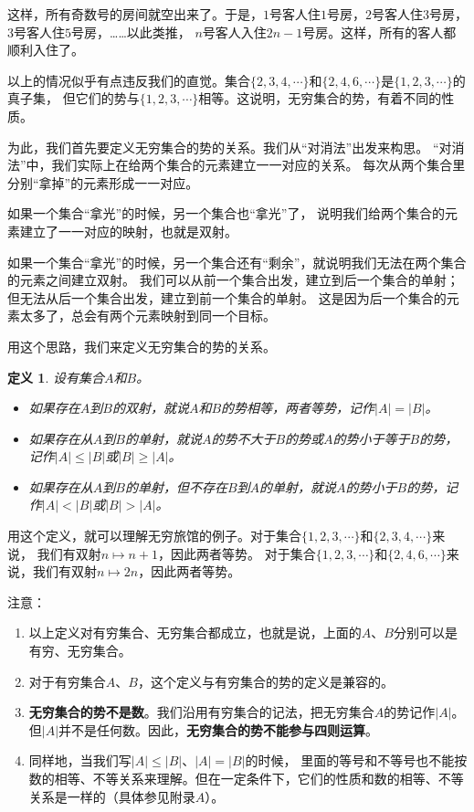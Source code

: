 \documentclass[12pt,UTF8]{ctexbook}
\newtheorem{df}{定义}[section]
\begin{document}
这样，所有奇数号的房间就空出来了。于是，$1$号客人住$1$号房，$2$号客人住$3$号房，$3$号客人住$5$号房，……以此类推，
$n$号客人入住$2n-1$号房。这样，所有的客人都顺利入住了。

以上的情况似乎有点违反我们的直觉。集合$\{2,3,4,\cdots\}$和$\{2,4,6,\cdots\}$是$\{1,2,3,\cdots\}$的真子集，
但它们的势与$\{1,2,3,\cdots\}$相等。这说明，无穷集合的势，有着不同的性质。

为此，我们首先要定义无穷集合的势的关系。我们从“对消法”出发来构思。
“对消法”中，我们实际上在给两个集合的元素建立一一对应的关系。
每次从两个集合里分别“拿掉”的元素形成一一对应。

如果一个集合“拿光”的时候，另一个集合也“拿光”了，
说明我们给两个集合的元素建立了一一对应的映射，也就是双射。

如果一个集合“拿光”的时候，另一个集合还有“剩余”，就说明我们无法在两个集合的元素之间建立双射。
我们可以从前一个集合出发，建立到后一个集合的单射；但无法从后一个集合出发，建立到前一个集合的单射。
这是因为后一个集合的元素太多了，总会有两个元素映射到同一个目标。

用这个思路，我们来定义无穷集合的势的关系。

\begin{df}\label{df:1-0-0}
    设有集合$A$和$B$。
    \begin{itemize}
        \item 如果存在$A$到$B$的双射，就说$A$和$B$的势相等，两者等势，记作$|A| = |B|$。
        \item 如果存在从$A$到$B$的单射，就说$A$的势不大于$B$的势或$A$的势小于等于$B$的势，记作$|A| \leqslant |B|$或$|B| \geqslant |A|$。
        \item 如果存在从$A$到$B$的单射，但不存在$B$到$A$的单射，就说$A$的势小于$B$的势，记作$|A| < |B|$或$|B| > |A|$。
    \end{itemize}
\end{df}

用这个定义，就可以理解无穷旅馆的例子。对于集合$\{1,2,3,\cdots\}$和$\{2,3,4,\cdots\}$来说，
我们有双射$n\mapsto n+1$，因此两者等势。
对于集合$\{1,2,3,\cdots\}$和$\{2,4,6,\cdots\}$来说，我们有双射$n\mapsto 2n$，因此两者等势。

注意：
\begin{enumerate}
    \item 以上定义对有穷集合、无穷集合都成立，也就是说，上面的$A$、$B$分别可以是有穷、无穷集合。
    \item 对于有穷集合$A$、$B$，这个定义与有穷集合的势的定义是兼容的。
    \item \textbf{无穷集合的势不是数}。我们沿用有穷集合的记法，把无穷集合$A$的势记作$|A|$。
    但$|A|$并不是任何数。因此，\textbf{无穷集合的势不能参与四则运算}。
    \item 同样地，当我们写$|A| \leqslant |B|$、$|A| = |B|$的时候，
    里面的等号和不等号也不能按数的相等、不等关系来理解。但在一定条件下，它们的性质和数的相等、不等关系是一样的（具体参见附录$A$）。
\end{enumerate}
\end{document}
